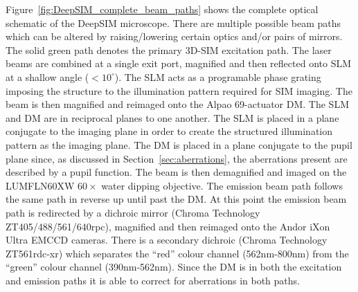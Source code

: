 Figure~\ref{fig:DeepSIM_complete_beam_paths} shows the complete
optical schematic of the DeepSIM microscope. There are multiple
possible beam paths which can be altered by raising/lowering certain
optics and/or pairs of mirrors. The solid green path denotes the
primary 3D-SIM excitation path. The laser beams are combined at a
single exit port, magnified and then reflected onto SLM at a shallow 
angle ($<10^{\circ}$). The SLM acts as a programable phase grating 
imposing the structure to the illumination pattern required for SIM 
imaging. The beam is then magnified and reimaged onto the Alpao 
69-actuator DM. The SLM and DM are in reciprocal planes to one another. 
The SLM is placed in a plane conjugate to the imaging plane in order to 
create the structured illumination pattern as the imaging plane. The DM 
is placed in a plane conjugate to the pupil plane since, as discussed in 
Section~\ref{sec:aberrations}, the aberrations present are described by a 
pupil function. The beam is then demagnified and imaged on the LUMFLN60XW 
$60\times$ water dipping objective. The emission beam path follows the 
same path in reverse up until past the DM. At this point the emission 
beam path is redirected by a dichroic mirror (Chroma Technology 
ZT405/488/561/640rpc), magnified and then reimaged onto the Andor iXon 
Ultra EMCCD cameras. There is a secondary dichroic (Chroma Technology 
ZT561rdc-xr) which separates the ``red'' colour channel (562nm-800nm) 
from the ``green'' colour channel (390nm-562nm). Since the DM is in both 
the excitation and emission paths it is able to correct for aberrations 
in both paths.

